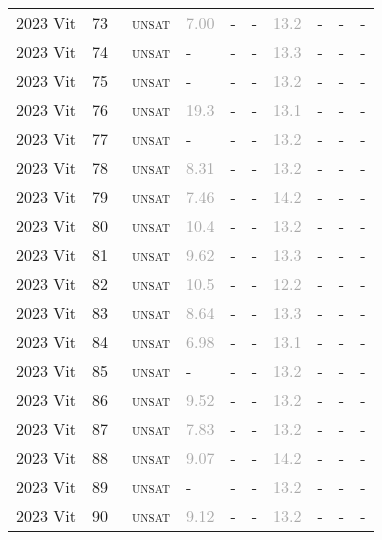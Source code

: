 \begin{center}
{\begin{longtable}{@{}llllllllll@{}}
2023 Vit & 73 & ~\textsc{unsat} & \textcolor{darkgray}{7.00} & - & - & \textcolor{darkgray}{13.2} & - & - & - \\
2023 Vit & 74 & ~\textsc{unsat} & - & - & - & \textcolor{darkgray}{13.3} & - & - & - \\
2023 Vit & 75 & ~\textsc{unsat} & - & - & - & \textcolor{darkgray}{13.2} & - & - & - \\
2023 Vit & 76 & ~\textsc{unsat} & \textcolor{darkgray}{19.3} & - & - & \textcolor{darkgray}{13.1} & - & - & - \\
2023 Vit & 77 & ~\textsc{unsat} & - & - & - & \textcolor{darkgray}{13.2} & - & - & - \\
2023 Vit & 78 & ~\textsc{unsat} & \textcolor{darkgray}{8.31} & - & - & \textcolor{darkgray}{13.2} & - & - & - \\
2023 Vit & 79 & ~\textsc{unsat} & \textcolor{darkgray}{7.46} & - & - & \textcolor{darkgray}{14.2} & - & - & - \\
2023 Vit & 80 & ~\textsc{unsat} & \textcolor{darkgray}{10.4} & - & - & \textcolor{darkgray}{13.2} & - & - & - \\
2023 Vit & 81 & ~\textsc{unsat} & \textcolor{darkgray}{9.62} & - & - & \textcolor{darkgray}{13.3} & - & - & - \\
2023 Vit & 82 & ~\textsc{unsat} & \textcolor{darkgray}{10.5} & - & - & \textcolor{darkgray}{12.2} & - & - & - \\
2023 Vit & 83 & ~\textsc{unsat} & \textcolor{darkgray}{8.64} & - & - & \textcolor{darkgray}{13.3} & - & - & - \\
2023 Vit & 84 & ~\textsc{unsat} & \textcolor{darkgray}{6.98} & - & - & \textcolor{darkgray}{13.1} & - & - & - \\
2023 Vit & 85 & ~\textsc{unsat} & - & - & - & \textcolor{darkgray}{13.2} & - & - & - \\
2023 Vit & 86 & ~\textsc{unsat} & \textcolor{darkgray}{9.52} & - & - & \textcolor{darkgray}{13.2} & - & - & - \\
2023 Vit & 87 & ~\textsc{unsat} & \textcolor{darkgray}{7.83} & - & - & \textcolor{darkgray}{13.2} & - & - & - \\
2023 Vit & 88 & ~\textsc{unsat} & \textcolor{darkgray}{9.07} & - & - & \textcolor{darkgray}{14.2} & - & - & - \\
2023 Vit & 89 & ~\textsc{unsat} & - & - & - & \textcolor{darkgray}{13.2} & - & - & - \\
2023 Vit & 90 & ~\textsc{unsat} & \textcolor{darkgray}{9.12} & - & - & \textcolor{darkgray}{13.2} & - & - & - \\

\end{longtable}}
\end{center}
